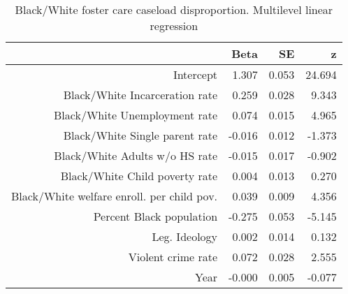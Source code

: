 \begin{table}[ht]
\centering
\begin{tabular}{rrrr}
  \hline
 & Beta & SE & z \\ 
  \hline
Intercept & 1.307 & 0.053 & 24.694 \\ 
  Black/White Incarceration rate & 0.259 & 0.028 & 9.343 \\ 
  Black/White Unemployment rate & 0.074 & 0.015 & 4.965 \\ 
  Black/White Single parent rate & -0.016 & 0.012 & -1.373 \\ 
  Black/White Adults w/o HS rate & -0.015 & 0.017 & -0.902 \\ 
  Black/White Child poverty rate & 0.004 & 0.013 & 0.270 \\ 
  Black/White welfare enroll. per child pov. & 0.039 & 0.009 & 4.356 \\ 
  Percent Black population & -0.275 & 0.053 & -5.145 \\ 
  Leg. Ideology & 0.002 & 0.014 & 0.132 \\ 
  Violent crime rate & 0.072 & 0.028 & 2.555 \\ 
  Year & -0.000 & 0.005 & -0.077 \\ 
   \hline
\end{tabular}
\caption{Black/White foster care caseload disproportion. Multilevel linear regression} 
\label{b.d.tab}
\end{table}
